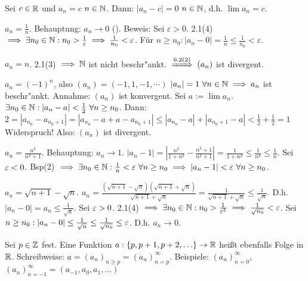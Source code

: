\documentclass[a4paper,twoside,DIV15,BCOR12mm]{scrbook}
\begin{document}
\begin{beispiele}
\item Sei $c \in \mathbb{R}$ und $a_n = c$ \ffa $n\in\mathbb{N}$. Dann: $|a_n - c| =0$ \ffa $n\in\mathbb{N}$, d.h. $\lim{a_n} = c$.
\item $a_n = \frac{1}{n}$. Behauptung: $a_n \to 0$ (). Beweis: Sei $\varepsilon > 0$. 2.1(4) $\implies \exists n_0 \in \mathbb{N}: n_0 > \frac{1}\varepsilon \implies \frac{1}{n_0} < \varepsilon$. Für $n \ge n_0: |a_n - 0| = \frac{1}{n} \le \frac{1}{n_0} < \varepsilon$.
\item $a_n = n$. 2.1(3) $\implies \mathbb{N}$ ist nicht beschr"ankt. $\folgtnach{6.2(2)} (a_n)$ ist divergent.
\item $a_n = (-1)^n$, also $(a_n) = (-1, 1, -1, \cdots)$ $|a_n|=1 \ \forall n\in\mathbb{N} \implies a_n$ ist beschr"ankt. Annahme: $(a_n)$ ist konvergent. Sei $a:=\lim a_n$. $\exists n_0\in\mathbb{N} : |a_n - a| < \frac{1}{2}\ \forall n \ge n_0$. Dann: $2=|a_{n_0}-a_{n_0+1}|=|a_{n_0}-a+a-a_{n_0+1}|\le|a_{n_0}-a|+|a_{n_0+1}-a|<\frac{1}{2} + \frac{1}{2}=1$ Widerspruch! Also: $(a_n)$ ist divergent.
\item $a_n = \frac{n^2}{n^2 + 1}$. Behauptung: $a_n \to 1$. $|a_n-1|=|\frac{n^2}{1+n^2}-\frac{n^2+1}{n^2+1}|=\frac{1}{1+n^2}\le\frac{1}{n^2}\le\frac{1}{n}$. Sei $\varepsilon<0$. Bsp(2) $\folgt \exists n_0 \in \MdN: \frac{1}{n}<\ep\ \forall n \ge n_0 \folgt |a_n-1|<\ep\ \forall n\ge n_0$.
\item $a_n = \sqrt{n+1}-\sqrt{n}$. $a_n = \frac{(\sqrt{n+1}-\sqrt{n})(\sqrt{n+1}+\sqrt{n})}{\sqrt{n+1}+\sqrt{n}}=\frac{1}{\sqrt{n+1}+\sqrt{n}}\le\frac{1}{\sqrt{n}}$. D.h. $|a_n-0|=a_n\le\frac{1}{\sqrt{n}}$. Sei $\varepsilon>0$. 2.1(4) $\implies \exists n_0\in\mathbb{N}: n_0>\frac{1}{{\varepsilon}^2}\implies\frac{1}{\sqrt{n_0}}<\varepsilon$. Sei $n \ge n_0: |a_n-0| \le \frac{1}{\sqrt{n}} \le \frac{1}{\sqrt{n_0}} \le \varepsilon$. D.h. $a_n \to 0$.
\end{beispiele}

\begin{bemerkung}
Sei $p\in\mathbb{Z}$ fest. Eine Funktion $a:\{p,p+1,p+2,\ldots\} \to \mathbb{R}$ heißt ebenfalls Folge in $\mathbb{R}$. Schreibweise: $a = (a_n)_{n\ge p} = (a_n)_{n = p}^\infty$. Beispiele: $(a_n)_{n=0}^\infty$, $(a_n)_{n=-1}^\infty = (a_{-1}, a_0, a_1, \ldots)$
\end{bemerkung}
\end{document}
